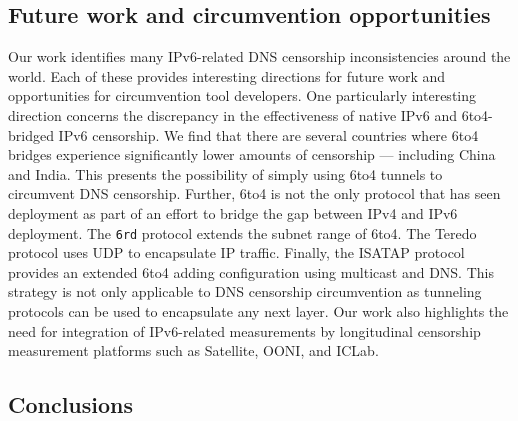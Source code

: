
\subsection{Future work and circumvention opportunities}
\label{sec:discussion:future_work}
Our work identifies many IPv6-related DNS censorship inconsistencies around the
world. Each of these provides interesting directions for future work and
opportunities for circumvention tool developers.
%
One particularly interesting direction concerns the discrepancy in the
effectiveness of native IPv6 and 6to4-bridged IPv6 censorship. We find that
there are several countries where 6to4 bridges experience significantly lower
amounts of censorship --- including China and India. This presents the
possibility of simply using 6to4 tunnels to circumvent DNS censorship. 
%
Further, 6to4 is not the only protocol that has seen deployment as part of an
effort to bridge the gap between IPv4 and IPv6 deployment. The \texttt{6rd}
protocol extends the subnet range of 6to4. The Teredo protocol uses UDP to
encapsulate IP traffic. Finally, the ISATAP protocol provides an extended 6to4
adding configuration using multicast and DNS. This strategy is not only
applicable to DNS censorship circumvention as tunneling protocols can be used to
encapsulate any next layer.
%
Our work also highlights the need for integration of IPv6-related measurements
by longitudinal censorship measurement platforms such as Satellite, OONI, and
ICLab. 

\subsection{Conclusions} \label{sec:discussion:conclusions}

